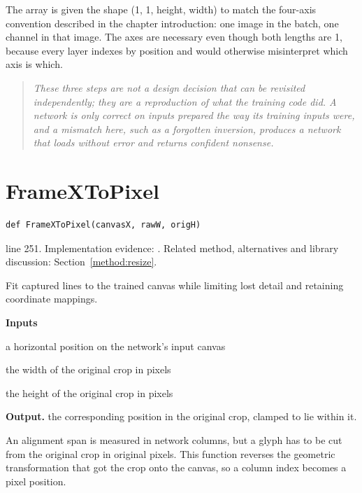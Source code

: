 The array is given the shape (1, 1, height, width) to match the four-axis convention described in the chapter introduction: one image in the batch, one channel in that image. The axes are necessary even though both lengths are 1, because every layer indexes by position and would otherwise misinterpret which axis is which.


\begin{quote}\small\itshape These three steps are not a design decision that can be revisited independently; they are a reproduction of what the training code did. A network is only correct on inputs prepared the way its training inputs were, and a mismatch here, such as a forgotten inversion, produces a network that loads without error and returns confident nonsense.\end{quote}


\section{FrameXToPixel}\label{fn:recognise:FrameXToPixel}
\begin{lstlisting}[style=sig]
def FrameXToPixel(canvasX, rawW, origH)
\end{lstlisting}
 line 251. Implementation evidence: \cite{code2026}. Related method, alternatives and library discussion: Section~\ref{method:resize}.


Fit captured lines to the trained canvas while limiting lost detail and retaining coordinate mappings.




\noindent\textbf{Inputs}
\begin{description}[leftmargin=2.2em,style=nextline,font=\normalfont\ttfamily]\setlength\itemsep{1pt}
  \item[{canvasX}] \normalfont a horizontal position on the network's input canvas
  \item[{rawW}] \normalfont the width of the original crop in pixels
  \item[{origH}] \normalfont the height of the original crop in pixels
\end{description}

\noindent\textbf{Output.} the corresponding position in the original crop, clamped to lie within it.


An alignment span is measured in network columns, but a glyph has to be cut from the original crop in original pixels. This function reverses the geometric transformation that got the crop onto the canvas, so a column index becomes a pixel position.


